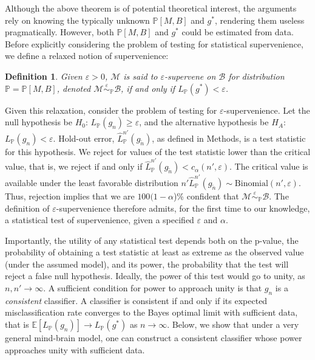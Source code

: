 \documentclass{article}
\newcommand{\conv}{\rightarrow}
\newcommand{\mB}{\mathcal{B}}
\newcommand{\mM}{\mathcal{M}}
\newcommand{\PP}{\mathbb{P}}           %
\newcommand{\EE}{\mathbb{E}}           %
\newcommand{\eps}{\varepsilon}
\providecommand{\mt}[1]{\widetilde{#1}}
\newcommand{\hL}{\widehat{L}}
\newcommand{\MeB}{\mM \overset{\varepsilon}{{\sim}}_{\PP} \mB}
\newtheorem{defi}{Definition}
\begin{document}
Although the above theorem is of potential theoretical interest, the arguments rely on knowing the typically unknown $\PP[M,B]$ and $g^*$, rendering them useless pragmatically.  However, both $\PP[M,B]$ and $g^*$ could be estimated from data.  
Before explicitly considering the problem of testing for statistical supervenience, we define a relaxed notion of supervenience:
\begin{defi}
\label{def2}
Given $\varepsilon > 0$, $\mM$ is said to $\varepsilon$-\textit{supervene} on $\mB$ for distribution $\PP=\PP[M,B]$, denoted $\MeB$, if and only if $L_{\PP}(g^*) < \varepsilon$.
\end{defi}

Given this relaxation, consider the problem of testing for $\eps$-supervenience. Let the null hypothesis be $H_0$: $L_{\PP}(g_n) \geq \eps$, and the alternative hypothesis be $H_A$: $L_{\PP}(g_n) < \eps$. Hold-out error, $\hL^{n'}_{\PP}(g_{\mt{n}})$, as defined in Methods, is a test statistic for this hypothesis.  We reject for values of the test statistic lower than the critical value, that is, we reject if and only if $\hL^{n'}_{\PP}(g_{\mt{n}}) <c_{\alpha}(n',\varepsilon)$.  The critical value is available under the least favorable distribution $n' \hL^{n'}_{\PP}(g_{\mt{n}}) \sim \text{Binomial}(n',\varepsilon)$.  Thus, rejection implies that we are $100(1-\alpha$)\% confident that $\MeB$.  The definition of $\eps$-supervenience therefore admits, for the first time to our knowledge, a statistical test of supervenience, given a specified $\eps$ and $\alpha$. 

	
	
Importantly, the utility of any statistical test depends both on the p-value, the probability of obtaining a test statistic at least as extreme as the observed value (under the assumed model), and its power, the probability that the test will reject a false null hypothesis.  Ideally, the power of this test would go to unity, as $n,n' \rightarrow \infty$.  A sufficient condition for power to approach unity is that $g_n$ is a \emph{consistent} classifier.  A classifier is consistent if and only if its expected misclassification rate converges to the Bayes optimal limit with sufficient data, that is $\EE[L_{\PP}(g_n)] \conv L_{\PP}(g^*)$ as $n\conv \infty$.  Below, we show that under a very general mind-brain model, one can construct a consistent classifier whose power approaches unity with sufficient data.
\end{document}
